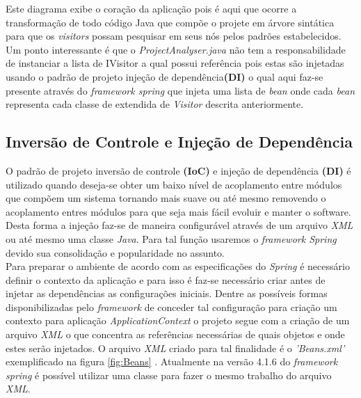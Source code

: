 Este diagrama exibe o coração da aplicação pois é aqui que ocorre a transformação de todo código Java que compõe o projete em árvore sintática para que os {\it visitors}  \cite{Gamma:1995:DPE:186897} possam pesquisar em seus nós pelos padrões estabelecidos.\\

Um ponto interessante é que o \textit{ProjectAnalyser.java} não tem a responsabilidade de instanciar a lista de IVisitor a qual possui referência pois estas são injetadas usando o padrão de projeto injeção de dependência\textbf{(DI)} o qual aqui faz-se presente através do {\it framework spring} que injeta uma lista de \textit{bean} onde cada \textit{bean} representa cada classe de extendida de {\it Visitor} descrita anteriormente.\\

\clearpage


\subsection{Inversão de Controle e Injeção de Dependência}
O padrão de projeto inversão de controle \textbf{(IoC)} e injeção de dependência \textbf{(DI)} é utilizado quando deseja-se obter um baixo nível de acoplamento entre módulos que compõem um sistema tornando mais suave ou até mesmo removendo o acoplamento entres módulos para que seja mais fácil evoluir e manter o software. Desta forma a injeção faz-se de maneira configurável através de um arquivo \textit{XML} ou até mesmo uma classe \textit{Java}. Para tal função usaremos o {\it framework Spring} devido sua consolidação e popularidade no assunto.\\

Para preparar o ambiente de acordo com as especificações do {\it Spring} é necessário definir o contexto da aplicação e para isso é faz-se necessário criar antes de injetar as dependências as configurações iniciais. Dentre as possíveis formas disponibilizadas pelo {\it framework} de conceder tal configuração para criação um contexto para aplicação \textit{ApplicationContext} o projeto segue com a criação de um arquivo \textit{XML} o que concentra as referências necessárias de quais objetos e onde estes serão injetados. O arquivo \textit{XML} criado para tal finalidade é o \textit{'Beans.xml'} exemplificado na figura \ref{fig:Beans} . Atualmente na versão 4.1.6 do {\it framework spring} é possível utilizar uma classe para fazer o mesmo trabalho do arquivo \textit{XML}. \\

